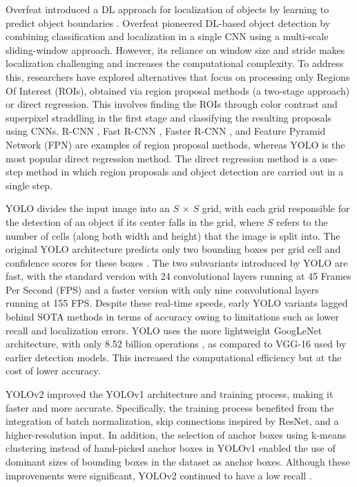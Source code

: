 \documentclass{ieeeaccess}
\begin{document}
Overfeat introduced a DL approach for localization of objects by learning to predict object boundaries \cite{overfeat}. Overfeat pioneered DL-based object detection by combining classification and localization in a single CNN using a multi-scale sliding-window approach. However, its reliance on window size and stride makes localization challenging and increases the computational complexity. To address this, researchers have explored alternatives that focus on processing only Regions Of Interest (ROIs), obtained via region proposal methods (a two-stage approach) or direct regression. This involves finding the ROIs through color contrast and superpixel straddling in the first stage and classifying the resulting proposals using CNNs. R-CNN \cite{RCNN}, Fast R-CNN \cite{FastRCNN}, Faster R-CNN \cite{FasterRCNN}, and Feature Pyramid Network (FPN) \cite{FPN} are examples of region proposal methods, whereas YOLO is the most popular direct regression method. The direct regression method is a one-step method in which region proposals and object detection are carried out in a single step.

YOLO divides the input image into an $S$ × $S$ grid, with each grid responsible for the detection of an object if its center falls in the grid, where $S$ refers to the number of cells (along both width and height) that the image is split into. The original YOLO architecture predicts only two bounding boxes per grid cell and confidence scores for these boxes \cite{Redmon2015YouOL}. The two subvariants introduced by YOLO are fast, with the standard version with 24 convolutional layers running at 45 Frames Per Second (FPS) and a faster version with only nine convolutional layers running at 155 FPS. Despite these real-time speeds, early YOLO variants lagged behind SOTA methods in terms of accuracy owing to limitations such as lower recall and localization errors. YOLO uses the more lightweight GoogLeNet architecture, with only 8.52 billion operations \cite{lin2013network}, as compared to VGG-16 used by earlier detection models. This increased the computational efficiency but at the cost of lower accuracy.

YOLOv2 improved the YOLOv1 architecture and training process, making it faster and more accurate. Specifically, the training process benefited from the integration of batch normalization, skip connections inspired by ResNet, and a higher-resolution input. In addition, the selection of anchor boxes using k-means clustering instead of hand-picked anchor boxes in YOLOv1 enabled the use of dominant sizes of bounding boxes in the dataset as anchor boxes. Although these improvements were significant, YOLOv2 continued to have a low recall \cite{Redmon2016YOLO9000BF}. 
\end{document}
